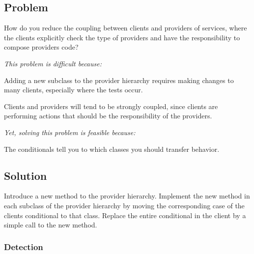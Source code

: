 \documentclass[a4paper,10pt,twoside]{book}
\begin{document}



\subsection*{Problem}

How do you reduce the coupling between clients and providers of services, where the clients explicitly check the type of providers and have the responsibility to compose providers code?

\emph{This problem is difficult because:}

\begin{bulletlist}
\item Adding a new subclass to the provider hierarchy requires making changes to many clients, especially where the tests occur.

\item Clients and providers will tend to be strongly coupled, since clients are performing actions that should be the responsibility of the providers. 
\end{bulletlist}

\emph{Yet, solving this problem is feasible because:}

\begin{bulletlist}
\item The conditionals tell you to which classes you should transfer behavior.
\end{bulletlist}

\subsection*{Solution}

Introduce a new method to the provider hierarchy. Implement the new method in each subclass of the provider hierarchy by moving the corresponding case of the clients conditional to that class. Replace the entire conditional in the client by a simple call to the new method.

\subsubsection*{Detection}
\end{document}

